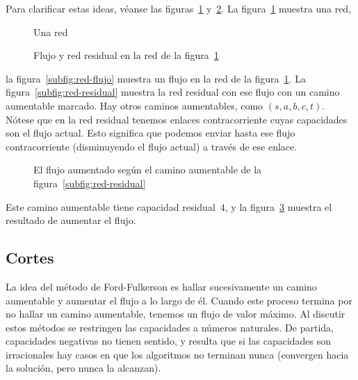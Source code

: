   Para clarificar estas ideas,
  véanse las figuras~\ref{fig:red} y~\ref{fig:red-flujos}.
  La figura~\ref{fig:red} muestra una red,
  \begin{figure}[htbp]
    \centering
    \caption{Una red}
    \label{fig:red}
  \end{figure}
  \begin{figure}[htbp]
    \centering

    \caption{Flujo y red residual
	     en la red de la figura~\ref{fig:red}}
    \label{fig:red-flujos}
  \end{figure}
  la figura~\ref{subfig:red-flujo}
  muestra un flujo en la red de la figura~\ref{fig:red}.
  La figura~\ref{subfig:red-residual}
  muestra la red residual con ese flujo
  con un camino aumentable marcado.
  Hay otros caminos aumentables,
  como \((s, a, b, c, t)\).
  Nótese que en la red residual tenemos enlaces contracorriente
  cuyas capacidades son el flujo actual.
  Esto significa que podemos enviar hasta ese flujo contracorriente
  (disminuyendo el flujo actual)
  a través de ese enlace.
  \begin{figure}[htbp]
    \centering
    \caption{El flujo aumentado según el camino aumentable
	     de la figura~\ref{subfig:red-residual}}
    \label{fig:red-flujo-aumentado}
  \end{figure}
  Este camino aumentable tiene capacidad residual~\(4\),
  y la figura~\ref{fig:red-flujo-aumentado}
  muestra el resultado de aumentar el flujo.

\subsection{Cortes}
\label{sec:cortes}

  La idea del método de Ford-Fulkerson
  es hallar sucesivamente un camino aumentable
  y aumentar el flujo a lo largo de él.
  Cuando este proceso termina
  por no hallar un camino aumentable,
  tenemos un flujo de valor máximo.
  Al discutir estos métodos
  se restringen las capacidades a números naturales.
  De partida,
  capacidades negativas no tienen sentido,
  y resulta que si las capacidades son irracionales
  hay casos en que los algoritmos no terminan nunca
  (convergen hacia la solución,
   pero nunca la alcanzan).

